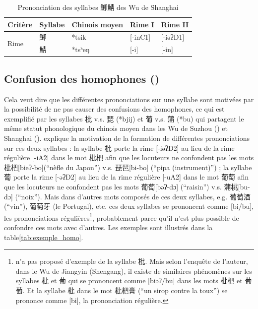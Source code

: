 \documentclass{scrbook}
\newcounter{c}[subsubsection]
\newcommand{\illustre}{Les exemples sont illustrés dans la table\xspace}
\begin{document}
\begin{sloppypar}
\begin{table}[htbp]
  \centering
    \begin{tabular}{lllll}
    \toprule
    Critère & Syllabe & Chinois moyen  & Rime I & Rime II \\
    \midrule
    \multirow{2}[2]{*}{Rime} & 鯽     & *tsik & [-inC1] & [-iəʔD1] \\
          & 鯖     & *tsʰeŋ & [-i] & [-in] \\
    \bottomrule
    \end{tabular}%
  \caption{Prononciation des syllabes 鯽鯖 des Wu de Shanghai}
  \label{tab:exemple_interne}%
\end{table}%

\subsection{Confusion des homophones (\cite[135]{Shen1988shanghai})}\label{phenom4}
Cela veut dire que les différentes prononciations sur une syllabe sont motivées par la possibilité de ne pas causer des confusions des homophones, ce qui est exemplifié par les syllabes 枇 v.s. 琵 (*bjij) et 葡 v.s. 蒲 (*bu) qui partagent le même statut phonologique du chinois moyen dans les Wu de Suzhou (\cite[26]{Ye1988suzhou}) et Shanghai (\cite[135]{Shen1988shanghai}). \textcite[135]{Shen1988shanghai} explique la motivation de la formation de différentes prononciations sur ces deux syllabes : la syllabe 枇 porte la rime [-iəʔD2] au lieu de la rime régulière [-iA2] dans le mot 枇杷 afin que les locuteurs ne confondent pas les mots 枇杷[bieʔ-bo](``nèfle du Japon'') v.s. 琵琶[bi-bo] (``pipa (instrument)'') ; la syllabe 葡 porte la rime [-əʔD2] au lieu de la rime régulière [-uA2] dans le mot 葡萄 afin que les locuteurs ne confondent pas les mots 葡萄[bəʔ-dɔ] (``raisin'') v.s. 蒲桃[bu-dɔ] (``noix''). Mais dans d'autres mots composés de ces deux syllabes, e.g. 葡萄酒 (``vin''), 葡萄牙 (le Portugal), etc. ces deux syllabes se prononcent comme [bi/bu], les prononciations régulières\footnote{\textcite[135]{Shen1988shanghai} n'a pas proposé d'exemple de la syllabe 枇. Mais selon l'enquête de l'auteur, dans le Wu de Jiangyin (Shengang), il existe de similaires phénomènes sur les syllabes 枇 et 葡 qui se prononcent comme [biəʔ/bu] dans les mots 枇杷 et 葡萄. Et la syllabe 枇 dans le mot 枇杷膏 (``un sirop contre la toux'') se prononce comme [bi], la prononciation régulière.}, probablement parce qu'il n'est plus possible de confondre ces mots avec d'autres. \illustre \ref{tab:exemple_homo}.


\end{sloppypar}
\end{document}
